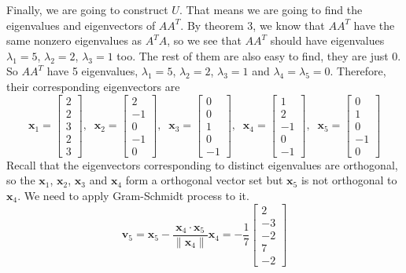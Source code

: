 \begin{ex}
\begin{solution}
		 Finally, we are going to construct $U$. That means we are going to find the eigenvalues and eigenvectors of $AA^T$. By theorem 3, we know that $AA^T$ have the same nonzero eigenvalues as $A^TA$, so we see that $AA^T$ should have eigenvalues $\lambda_1 = 5$, $\lambda_2 = 2$, $\lambda_3 = 1$ too. The rest of them are also easy to find, they are just $0$. So $AA^T$ have 5 eigenvalues, $\lambda_1 = 5$, $\lambda_2 = 2$, $\lambda_3 = 1$ and $\lambda_4 = \lambda_5 = 0$. Therefore, their corresponding eigenvectors are
		 \[ \mathbf{x}_1 = \begin{bmatrix} 2\\ 2\\ 3\\ 2\\ 3 \end{bmatrix},\;\;
		 \mathbf{x}_2 = \begin{bmatrix} 2\\ -1\\ 0\\ -1\\ 0 \end{bmatrix},\;\;
		 \mathbf{x}_3 = \begin{bmatrix} 0\\ 0\\ 1\\ 0\\ -1 \end{bmatrix},\;\;
		 \mathbf{x}_4 = \begin{bmatrix} 1\\ 2\\ -1\\ 0\\ -1 \end{bmatrix},\;\;
		 \mathbf{x}_5 = \begin{bmatrix} 0\\ 1\\ 0\\ -1\\ 0 \end{bmatrix} \]
		 Recall that the eigenvectors corresponding to distinct eigenvalues are orthogonal, so the $\mathbf{x}_1$, $\mathbf{x}_2$, $\mathbf{x}_3$ and $\mathbf{x}_4$ form a orthogonal vector set but $\mathbf{x}_5$ is not orthogonal to $\mathbf{x}_4$. We need to apply Gram-Schmidt process to it.
		 \[ \mathbf{v}_5 = \mathbf{x}_5 - \frac{\mathbf{x}_4\cdot\mathbf{x}_5}{\|\mathbf{x}_4\|}\mathbf{x}_4
		 = -\frac{1}{7}\begin{bmatrix} 2\\ -3\\ -2\\ 7\\ -2 \end{bmatrix} \]
		 

\end{solution}
\end{ex}
